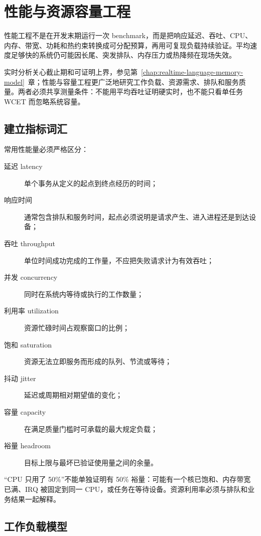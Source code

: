 \chapter{性能与资源容量工程}
\label{chap:performance-capacity-engineering}

性能工程不是在开发末期运行一次 benchmark，而是把响应延迟、吞吐、CPU、内存、带宽、功耗和热约束转换成可分配预算，再用可复现负载持续验证。平均速度足够快的系统仍可能因长尾、突发排队、内存压力或热降频在现场失效。

实时分析关心截止期和可证明上界，参见第~\ref{chap:realtime-language-memory-model}~章；性能与容量工程更广泛地研究工作负载、资源需求、排队和服务质量。两者必须共享测量条件：不能用平均吞吐证明硬实时，也不能只看单任务 WCET 而忽略系统容量。

\section{建立指标词汇}

常用性能量必须严格区分：

\begin{description}
  \item[延迟 latency] 单个事务从定义的起点到终点经历的时间；
  \item[响应时间] 通常包含排队和服务时间，起点必须说明是请求产生、进入进程还是到达设备；
  \item[吞吐 throughput] 单位时间成功完成的工作量，不应把失败请求计为有效吞吐；
  \item[并发 concurrency] 同时在系统内等待或执行的工作数量；
  \item[利用率 utilization] 资源忙碌时间占观察窗口的比例；
  \item[饱和 saturation] 资源无法立即服务而形成的队列、节流或等待；
  \item[抖动 jitter] 延迟或周期相对期望值的变化；
  \item[容量 capacity] 在满足质量门槛时可承载的最大规定负载；
  \item[裕量 headroom] 目标上限与最坏已验证使用量之间的余量。
\end{description}

“CPU 只用了 50\%”不能单独证明有 50\% 裕量：可能有一个核已饱和、内存带宽已满、IRQ 被固定到同一 CPU，或任务在等待设备。资源利用率必须与排队和业务结果一起解释。

\section{工作负载模型}


